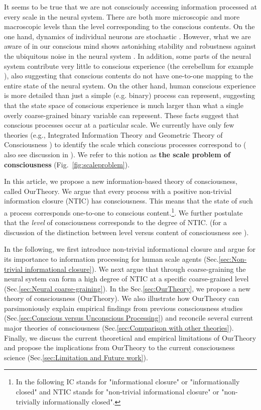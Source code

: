 \documentclass[utf8]{article}
\begin{document}
		It seems to be true that we are not consciously accessing information processed at every scale in the neural system. There are both more microscopic and more macroscopic levels than the level corresponding to the conscious contents. On the one hand, dynamics of individual neurons are stochastic \citep{Goldwyn2011, White2000}. However, what we are aware of in our conscious mind shows astonishing stability and robustness against the ubiquitous noise in the neural system \citep{mathis1995computational}. In addition, some parts of the neural system contribute very little to conscious experience (the cerebellum for example \citep{lemon2010life}), also suggesting that conscious contents do not have one-to-one mapping to the entire state of the neural system. On the other hand, human conscious experience is more detailed than just a simple (e.g. binary) process can represent, suggesting that the state space of conscious experience is much larger than what a single overly coarse-grained binary variable can represent. These facts suggest that conscious processes occur at a particular scale. We currently have only few theories (e.g., Integrated Information Theory \citep{hoel2016can} and Geometric Theory of Consciousness \citep{fekete2011towards,fekete2012lack}) to identify the scale which conscious processes correspond to ( also see discussion in \cite{fekete2016system}). We refer to this notion as \textbf{the scale problem of consciousness} (Fig.~\ref{fig:scaleproblem}).

		In this article, we propose a new information-based theory of consciousness, called \acf{OurTheory}. We argue that every process with a positive non-trivial information closure (NTIC) has consciousness. This means that the state of such a process corresponds one-to-one to conscious content.\footnote{In the following IC stands for "informational closure" or "informationally closed" and NTIC stands for "non-trivial informational closure" or "non-trivially informationally closed".}. We further postulate that the \textit{level} of consciousness corresponds to the degree of NTIC. (for a discussion of the distinction between level versus content of consciousness see \cite{laureys2005neural, overgaard2010neural}).
		
		In the following, we first introduce non-trivial informational closure and argue for its importance to information processing for human scale agents (Sec.\ref{sec:Non-trivial informational closure}). We next argue that through coarse-graining the neural system can form a high degree of NTIC at a specific coarse-grained level (Sec.\ref{sec:Neural coarse-graining}). In the Sec.\ref{sec:OurTheory}, we propose a new theory of consciousness (\ac{OurTheory}). We also illustrate how \ac{OurTheory} can parsimoniously explain empirical findings from previous consciousness studies (Sec.\ref{sec:Conscious versus Unconscious Processing}) and reconcile several current major theories of consciousness (Sec.\ref{sec:Comparison with other theories}). Finally, we discuss the current theoretical and empirical limitations of \ac{OurTheory} and propose the implications from \ac{OurTheory} to the current consciousness science (Sec.\ref{sec:Limitation and Future work}). 
\end{document}
